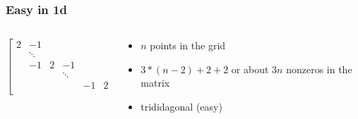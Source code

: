 \documentclass[10pt]{beamer}
\begin{document}
\begin{frame}
\frametitle{Easy in 1d}
\begin{columns}
  \begin{column}{0.48\textwidth}
  \end{column}
  \begin{column}{0.48\textwidth}
  \end{column}
\end{columns}
\begin{columns}
  \begin{column}{0.48\textwidth}
  \begin{equation*}
  \begin{bmatrix}
    2&-1      &   &        &      & \\
     & \ddots &   &        &      & \\
     & -1     & 2 & -1     &      & \\
     &        &   & \ddots &      & \\
     &        &   &        & -1   & 2\\
  \end{bmatrix}
  \end{equation*}
  \end{column}
  \begin{column}{0.48\textwidth}
  \begin{itemize}
  \item $n$ points in the grid
  \item $3*(n-2)+2+2$ or about $3n$ nonzeros in the matrix
  \item trididagonal (easy)
  \end{itemize}
  \end{column}
\end{columns}
\end{frame}
\end{document}
